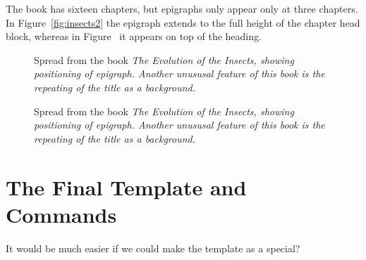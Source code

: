 The book has sixteen chapters, but epigraphs only appear only at three chapters. In Figure~\ref{fig:insects2} the epigraph extends to the full height of the chapter head block, whereas in Figure~ it appears on top of the heading.

\begin{figure}[htb]
\centering
{}
\caption{Spread from the book \emph{The Evolution of the Insects, showing positioning of epigraph. Another unususal feature of this book is the repeating of the title as a background.}}
\label{fig:insects3}
\end{figure}

\begin{figure}[htb]
\centering
{}
\caption{Spread from the book \emph{The Evolution of the Insects, showing positioning of epigraph. Another unususal feature of this book is the repeating of the title as a background.}}
\label{fig:insects4}
\end{figure}

\section{The Final Template and Commands}

It would be much easier if we could make the template as a special? 



\clearpage
\lipsum
\makeatletter\@runinheadfalse\makeatother
\let\HUGE\oldHUGE
{}%